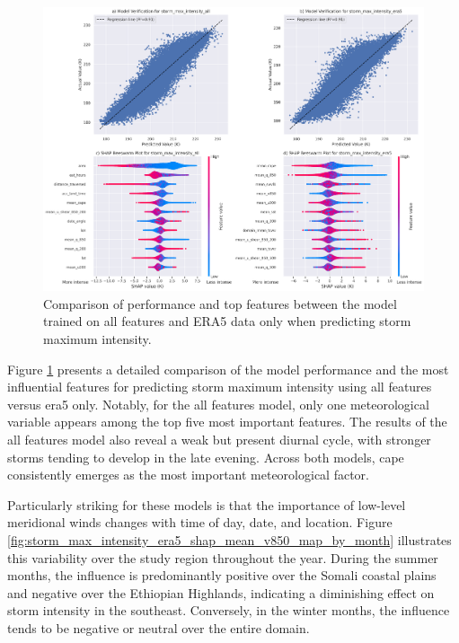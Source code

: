 \begin{figure}[ht]
    \centering
    \includegraphics[width=\textwidth]{../figures/generated/experiments/storm_max_intensity/storm_max_intensity_summary.png}
    \caption{Comparison of performance and top features between the model trained on all features and ERA5 data only when predicting storm maximum intensity.}
    \label{fig:storm_max_intensity_summary}
\end{figure}

Figure \ref{fig:storm_max_intensity_summary} presents a detailed comparison of the model performance and the most influential features for predicting storm maximum intensity using all features versus \acrshort{era5} only. Notably, for the all features model, only one meteorological variable appears among the top five most important features. The results of the all features model also reveal a weak but present diurnal cycle, with stronger storms tending to develop in the late evening. Across both models, \acrshort{cape} consistently emerges as the most important meteorological factor.

Particularly striking for these models is that the importance of low-level meridional winds changes with time of day, date, and location. Figure \ref{fig:storm_max_intensity_era5_shap_mean_v850_map_by_month} illustrates this variability over the study region throughout the year. During the summer months, the influence is predominantly positive over the Somali coastal plains and negative over the Ethiopian Highlands, indicating a diminishing effect on storm intensity in the southeast. Conversely, in the winter months, the influence tends to be negative or neutral over the entire domain.

